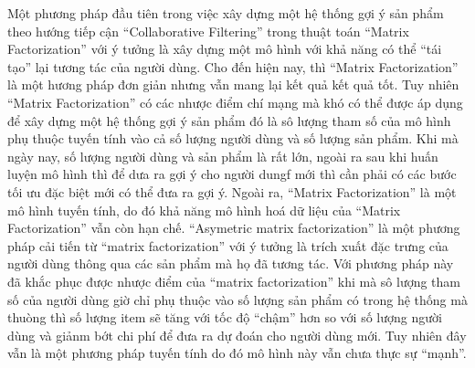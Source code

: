 Một phương pháp đầu tiên trong việc xây dựng một hệ thống gợi ý sản phẩm theo hướng tiếp cận ``Collaborative Filtering'' trong thuật toán ``Matrix Factorization'' với ý tưởng là xây dựng một mô hình với khả năng có thể ``tái tạo'' lại tương tác của người dùng.
Cho đến hiện nay, thì ``Matrix Factorization'' là một hương pháp đơn giản nhưng vẫn mang lại kết quả kết quả tốt.
Tuy nhiên ``Matrix Factorization'' có các nhược điểm chí mạng mà khó có thể được áp dụng để xây dựng một hệ thống gợi ý sản phẩm đó là sô lượng tham số của mô hình phụ thuộc tuyến tính vào cả số lượng người dùng và số lượng sản phẩm.
Khi mà ngày nay, số lượng người dùng và sản phẩm là rất lớn, ngoài ra sau khi huấn luyện mô hình thì để dưa ra gợi ý cho người dungf mới thì cần phải có các bước tối ưu đặc biệt mới có thể đưa ra gợi ý. 
Ngoài ra, ``Matrix Factorization'' là một mô hình tuyến tính, do đó khả năng mô hình hoá dữ liệu của ``Matrix Factorization'' vẫn còn hạn chế.
``Asymetric matrix factorization'' là một phương pháp cải tiến từ ``matrix factorization'' với ý tưởng là trích xuất đặc trưng của người dùng thông qua các sản phẩm mà họ đã tương tác. Với phương pháp này đã khắc phục được nhược điểm của ``matrix factorization'' khi mà sô lượng tham số của người dùng giờ chỉ phụ thuộc vào số lượng sản phẩm có trong hệ thống mà thuòng thì số lượng item sẽ tăng với tốc độ ``chậm'' hơn so với số lượng người dùng và giảnm bớt chi phí để đưa ra dự đoán cho người dùng mới. Tuy nhiên đây vẫn là một phương pháp tuyến tính do đó mô hình này vẫn chưa thực sự ``mạnh''. 

